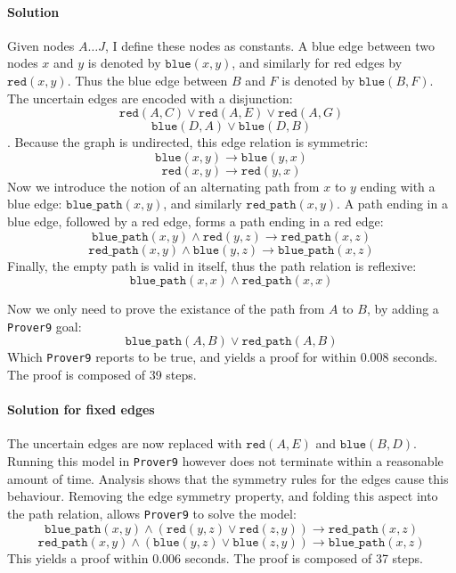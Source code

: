 \documentclass[12pt]{article}
\newcommand{\bimp}{\rightarrow}
\newcommand{\band}{\wedge}
\newcommand{\bor}{\vee}
\newcommand{\provernine}{\texttt{Prover9}\xspace}
\newcommand{\blue}[2]{\mathtt{blue}(#1, #2)}
\newcommand{\red}[2]{\mathtt{red}(#1, #2)}
\newcommand{\bluep}[2]{\mathtt{blue\_path}(#1, #2)}
\newcommand{\redp}[2]{\mathtt{red\_path}(#1, #2)}
\begin{document}
\paragraph{Solution}
Given nodes $A \ldots J$, I define these nodes as constants.
A blue edge between two nodes $x$ and $y$ is denoted by $\blue{x}{y}$,
and similarly for red edges by $\red{x}{y}$.
Thus the blue edge between $B$ and $F$ is denoted by $\blue{B}{F}$.
The uncertain edges are encoded with a disjunction:
\[ \red{A}{C} \bor \red{A}{E} \bor \red{A}{G} \]
\[ \blue{D}{A} \bor \blue{D}{B} \].
Because the graph is undirected, this edge relation is symmetric:
\[ \blue{x}{y} \bimp \blue{y}{x} \]
\[ \red{x}{y} \bimp \red{y}{x} \]
Now we introduce the notion of an alternating path from $x$ to $y$ ending with a blue edge:
$\bluep{x}{y}$, and similarly $\redp{x}{y}$.
A path ending in a blue edge, followed by a red edge, forms a path ending in a red edge:
\[ \bluep{x}{y} \band \red{y}{z} \bimp \redp{x}{z} \]
\[ \redp{x}{y} \band \blue{y}{z} \bimp \bluep{x}{z} \]
Finally, the empty path is valid in itself, thus the path relation is reflexive:
\[ \bluep{x}{x} \band \redp{x}{x} \]

Now we only need to prove the existance of the path from $A$ to $B$, by adding
a \provernine goal:
\[ \bluep{A}{B} \bor \redp{A}{B} \]
Which \provernine reports to be true, and yields a proof for within 0.008 seconds.
The proof is composed of 39 steps.

\paragraph{Solution for fixed edges}
The uncertain edges are now replaced with $\red{A}{E}$ and $\blue{B}{D}$.
Running this model in \provernine however does not terminate within a reasonable amount of time.
Analysis shows that the symmetry rules for the edges cause this behaviour.
Removing the edge symmetry property, and folding this aspect into the path relation,
allows \provernine to solve the model:
\[ \bluep{x}{y} \band (\red{y}{z} \bor \red{z}{y}) \bimp \redp{x}{z} \]
\[ \redp{x}{y} \band (\blue{y}{z} \bor \blue{z}{y}) \bimp \bluep{x}{z} \]
This yields a proof within 0.006 seconds.
The proof is composed of 37 steps.
\end{document}
